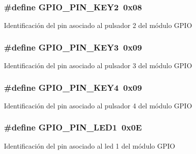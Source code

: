 \subsubsection[{\texorpdfstring{G\+P\+I\+O\+\_\+\+P\+I\+N\+\_\+\+K\+E\+Y2}{GPIO_PIN_KEY2}}]{\setlength{\rightskip}{0pt plus 5cm}\#define G\+P\+I\+O\+\_\+\+P\+I\+N\+\_\+\+K\+E\+Y2~0x08}\hypertarget{group__hardware_ga6fe528c749e6e3df18c66c78841fd2ae}{}\label{group__hardware_ga6fe528c749e6e3df18c66c78841fd2ae}
Identificación del pin asociado al pulsador 2 del módulo G\+P\+IO 
\subsubsection[{\texorpdfstring{G\+P\+I\+O\+\_\+\+P\+I\+N\+\_\+\+K\+E\+Y3}{GPIO_PIN_KEY3}}]{\setlength{\rightskip}{0pt plus 5cm}\#define G\+P\+I\+O\+\_\+\+P\+I\+N\+\_\+\+K\+E\+Y3~0x09}\hypertarget{group__hardware_ga6058161cd4273d1df2af95589e043055}{}\label{group__hardware_ga6058161cd4273d1df2af95589e043055}
Identificación del pin asociado al pulsador 3 del módulo G\+P\+IO 
\subsubsection[{\texorpdfstring{G\+P\+I\+O\+\_\+\+P\+I\+N\+\_\+\+K\+E\+Y4}{GPIO_PIN_KEY4}}]{\setlength{\rightskip}{0pt plus 5cm}\#define G\+P\+I\+O\+\_\+\+P\+I\+N\+\_\+\+K\+E\+Y4~0x09}\hypertarget{group__hardware_gabeaec154a7007cd91de9a8c775f4242f}{}\label{group__hardware_gabeaec154a7007cd91de9a8c775f4242f}
Identificación del pin asociado al pulsador 4 del módulo G\+P\+IO 
\subsubsection[{\texorpdfstring{G\+P\+I\+O\+\_\+\+P\+I\+N\+\_\+\+L\+E\+D1}{GPIO_PIN_LED1}}]{\setlength{\rightskip}{0pt plus 5cm}\#define G\+P\+I\+O\+\_\+\+P\+I\+N\+\_\+\+L\+E\+D1~0x0E}\hypertarget{group__hardware_gaa4637d2cb87305ea71351291117a95f6}{}\label{group__hardware_gaa4637d2cb87305ea71351291117a95f6}
Identificación del pin asociado al led 1 del módulo G\+P\+IO 
